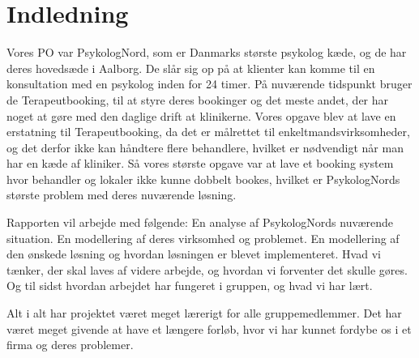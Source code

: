 \section{Indledning}
Vores PO var PsykologNord, som er Danmarks største psykolog kæde, og de har deres hovedsæde i Aalborg.
De slår sig op på at klienter kan komme til en konsultation med en psykolog inden for 24 timer.
På nuværende tidspunkt bruger de Terapeutbooking, til at styre deres bookinger og det meste andet, der har noget at gøre med den daglige drift at klinikerne.
Vores opgave blev at lave en erstatning til Terapeutbooking, da det er målrettet til enkeltmandsvirksomheder, og det derfor ikke kan håndtere flere behandlere, hvilket er nødvendigt når man har en kæde af kliniker.
Så vores største opgave var at lave et booking system hvor behandler og lokaler ikke kunne dobbelt bookes, hvilket er PsykologNords største problem med deres nuværende løsning.

Rapporten vil arbejde med følgende: En analyse af PsykologNords nuværende situation.
En modellering af deres virksomhed og problemet.
En modellering af den ønskede løsning og hvordan løsningen er blevet implementeret.
Hvad vi tænker, der skal laves af videre arbejde, og hvordan vi forventer det skulle gøres.
Og til sidst hvordan arbejdet har fungeret i gruppen, og hvad vi har lært.

Alt i alt har projektet været meget lærerigt for alle gruppemedlemmer.
Det har været meget givende at have et længere forløb, hvor vi har kunnet fordybe os i et firma og deres problemer.

\newpage